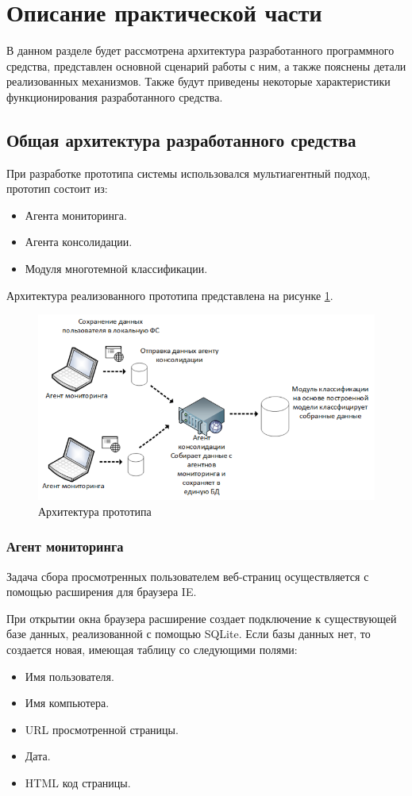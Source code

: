 \documentclass[russian, utf8, emptystyle]{eskdtext}
\begin{document}
\section{Описание практической части}
В данном разделе будет рассмотрена архитектура разработанного программного средства, представлен основной сценарий работы с ним, а также пояснены детали реализованных механизмов. Также будут приведены некоторые характеристики функционирования разработанного средства.
\subsection{Общая архитектура разработанного средства}
При разработке прототипа системы использовался мультиагентный подход, прототип состоит из:
\begin{itemize}
	\item Агента мониторинга.
	\item Агента консолидации.
	\item Модуля многотемной классификации.
\end{itemize}
Архитектура реализованного прототипа представлена на рисунке \ref{fig:prototype}.
	\begin{figure}[h]
		\begin{center}
			\includegraphics[width=12cm]{pic/arch.png}
			\caption{Архитектура прототипа}
			\label{fig:prototype}
		\end{center}
	\end{figure}
\subsubsection{Агент мониторинга}
Задача сбора просмотренных пользователем веб-страниц осуществляется с помощью расширения для браузера IE.

При открытии окна браузера расширение создает подключение к существующей базе данных, реализованной с помощью SQLite. Если базы данных нет, то создается новая, имеющая таблицу со следующими полями:
\begin{itemize}
	\item Имя пользователя.
	\item Имя компьютера.
	\item URL просмотренной страницы.
	\item Дата.
	\item HTML код страницы.
\end{itemize}
\end{document}
